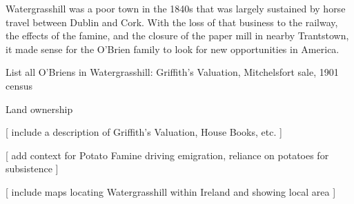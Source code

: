Watergrasshill was a poor town in the 1840s that was largely sustained by horse travel between Dublin and Cork. With the loss of that business to the railway, the effects of the famine, and the closure of the paper mill in nearby Trantstown, it made sense for the O'Brien family to look for new opportunities in America.




List all O'Briens in Watergrasshill: Griffith's Valuation, Mitchelsfort sale, 1901 census

Land ownership

[ include a description of Griffith's Valuation, House Books, etc. ]

[ add context for Potato Famine driving emigration, reliance on potatoes for subsistence ]

[ include maps locating Watergrasshill within Ireland and showing local area ]




